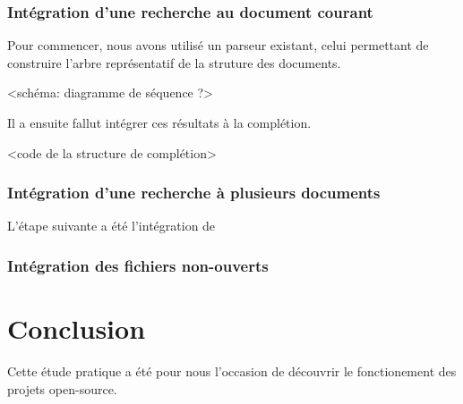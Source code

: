 \documentclass[a4paper,11pt]{report}
\begin{document}
\subsection{Intégration d'une recherche au document courant}
Pour commencer, nous avons utilisé un parseur existant, celui permettant de construire l'arbre représentatif de la struture des documents.

<schéma: diagramme de séquence ?>

Il a ensuite fallut intégrer ces résultats à la complétion.

<code de la structure de complétion> 

\subsection{Intégration d'une recherche à plusieurs documents}

L'étape suivante a été l'intégration de 

\subsection{Intégration des fichiers non-ouverts}

\chapter{Conclusion}
Cette étude pratique a été pour nous l'occasion de découvrir le fonctionement des projets open-source.
\end{document}
